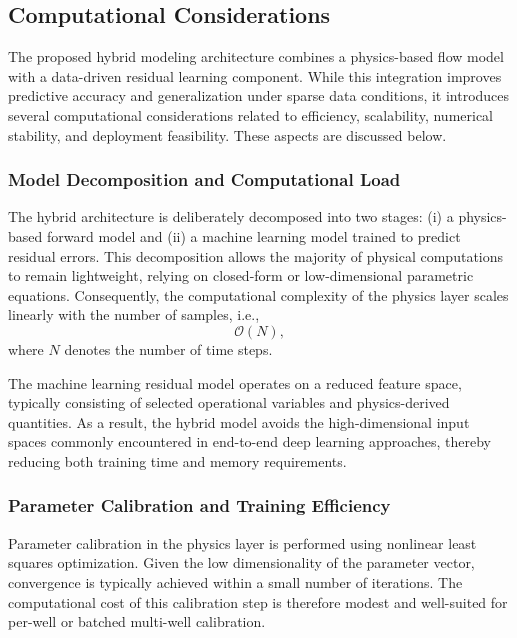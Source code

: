 \documentclass[12pt,APA]{uomthesis}
\begin{document}
\subsection{Computational Considerations}
\label{sec:computational_considerations}
The proposed hybrid modeling architecture combines a physics-based flow model with a data-driven residual learning component. While this integration improves predictive accuracy and generalization under sparse data conditions, it introduces several computational considerations related to efficiency, scalability, numerical stability, and deployment feasibility. These aspects are discussed below.

\subsubsection{Model Decomposition and Computational Load}

The hybrid architecture is deliberately decomposed into two stages: (i) a physics-based forward model and (ii) a machine learning model trained to predict residual errors. This decomposition allows the majority of physical computations to remain lightweight, relying on closed-form or low-dimensional parametric equations. Consequently, the computational complexity of the physics layer scales linearly with the number of samples, i.e.,
\begin{equation}
\mathcal{O}(N),
\end{equation}
where $N$ denotes the number of time steps.

The machine learning residual model operates on a reduced feature space, typically consisting of selected operational variables and physics-derived quantities. As a result, the hybrid model avoids the high-dimensional input spaces commonly encountered in end-to-end deep learning approaches, thereby reducing both training time and memory requirements.

\subsubsection{Parameter Calibration and Training Efficiency}

Parameter calibration in the physics layer is performed using nonlinear least squares optimization. Given the low dimensionality of the parameter vector, convergence is typically achieved within a small number of iterations. The computational cost of this calibration step is therefore modest and well-suited for per-well or batched multi-well calibration.
\end{document}
